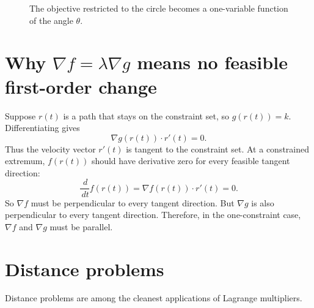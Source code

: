 \documentclass[11pt]{article}
\newcommand{\grad}{\nabla}
\newcommand{\dd}{\,d}
\begin{document}
\begin{figure}[H]
\centering
{}
\caption{The objective restricted to the circle becomes a one-variable function of the angle $\theta$.}
\end{figure}

\section{Why $\grad f=\lambda \grad g$ means no feasible first-order change}

Suppose $r(t)$ is a path that stays on the constraint set, so $g(r(t))=k$. Differentiating gives
\[
\grad g(r(t))\cdot r'(t)=0.
\]
Thus the velocity vector $r'(t)$ is tangent to the constraint set. At a constrained extremum, $f(r(t))$ should have derivative zero for every feasible tangent direction:
\[
\frac{\dd}{\dd t}f(r(t))=\grad f(r(t))\cdot r'(t)=0.
\]
So $\grad f$ must be perpendicular to every tangent direction. But $\grad g$ is also perpendicular to every tangent direction. Therefore, in the one-constraint case, $\grad f$ and $\grad g$ must be parallel.

\section{Distance problems}

Distance problems are among the cleanest applications of Lagrange multipliers.
\end{document}

